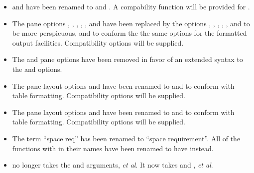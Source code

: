 \begin{itemize}
\item {} and  have been renamed to
 and .  A compability function will be provided
for .

\item The pane options , , , , , and
 have been replaced by the options , ,
, , , and  to be more
perspicuous, and to conform the the same options for the formatted output
facilities.  Compatibility options will be supplied.

\item The  and  pane options have been removed in favor
of an extended syntax to the  and  options.

\item The pane layout options  and  have been renamed to
 and  to conform with table formatting.  Compatibility
options will be supplied.

\item The pane layout options  and  have been renamed to
 and  to conform with table formatting.
Compatibility options will be supplied.

\item The term ``space req'' has been renamed to ``space requirement''.  All of
the functions with  in their names have been renamed to have
 instead.

\item {} no longer takes the  and 
arguments, {\it et al}.  It now takes  and , {\it et al}.
\end{itemize}
